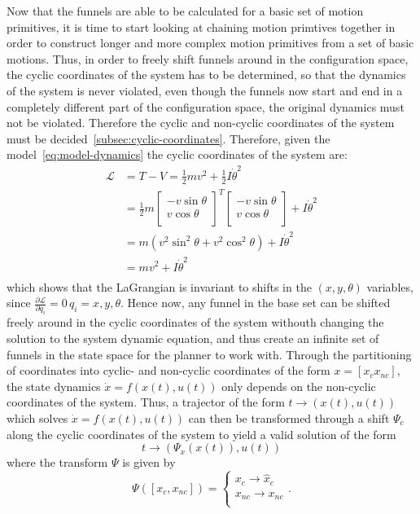 Now that the funnels are able to be calculated for a basic set of motion
primitives, it is time to start looking at chaining motion primtives together in
order to construct longer and more complex motion primitives from a set of basic
motions. Thus, in order to freely shift funnels around in the configuration
space, the cyclic coordinates of the system has to be determined, so that the
dynamics of the system is never violated, even though the funnels now start and
end in a completely different part of the configuration space, the original
dynamics must not be violated. Therefore the cyclic and non-cyclic coordinates
of the system must be decided~\ref{subsec:cyclic-coordinates}. Therefore, given
the model~\ref{eq:model-dynamics} the cyclic coordinates of the system are:
\begin{align}
  \mathcal{L} &= T - V = \frac{1}{2} mv^2 + \frac{1}{2}I\dot{\theta}^2 \\ 
              &= \frac{1}{2} 
                m\begin{bmatrix}
                  -v\sin \theta \\ 
                  v \cos \theta \\
                \end{bmatrix}^{T}
  \begin{bmatrix}
    -v\sin \theta \\
    v \cos \theta \\
  \end{bmatrix}
  + I\dot{\theta}^2 \\
              &= m \left(
                v^2 \sin^2 \theta + v^2 \cos^2 \theta
                \right)  + I {\dot{\theta}}^2 \\
              &= mv^2 + I {\dot{\theta}}^2 \\
\end{align}
which shows that the LaGrangian is invariant to shifts in the \((x,y,\theta)\)
variables, since \(\frac{\partial\mathcal{L}}{\partial q_i} = 0 \, q_i =
x,y,\theta\). Hence now, any funnel in the base set can be shifted freely around
in the cyclic coordinates of the system withouth changing the solution to the
system dynamic equation, and thus create an infinite set of funnels in the state
space for the planner to work with. Through the partitioning of coordinates into
cyclic- and non-cyclic coordinates of the form \(x = [x_c x_{nc}]\), the state
dynamics \(\dot{x} = f(x(t), u(t))\) only depends on the non-cyclic coordinates
of the system. Thus, a trajector of the form \(t \rightarrow (x(t),u(t))\) which
solves \(\dot{x} = f(x(t),u(t))\) can then be transformed through a shift
\(\Psi_c\) along the cyclic coordinates of the system to yield a valid solution
of the form
\[
  t \rightarrow (\Psi_{x}(x(t)), u(t))
\]
where the transform \(\Psi\) is given by
\[
  \Psi([x_c, x_{nc}]) =  
  \begin{cases}
    x_c \rightarrow \hat{x}_{c} \\
    x_{nc} \rightarrow x_{nc} \\
  \end{cases}.
\]

